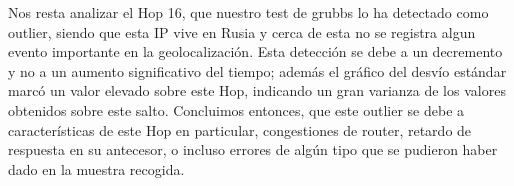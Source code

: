 Nos resta analizar el Hop 16, que nuestro test de grubbs lo ha detectado como outlier, siendo que esta IP vive en Rusia y cerca de esta no se registra algun evento importante en la geolocalización. Esta detección se debe a un decremento y no a un aumento significativo del tiempo; además el gráfico del desvío estándar marcó un valor elevado sobre este Hop, indicando un gran varianza de los valores obtenidos sobre este salto. Concluimos entonces, que este outlier se debe a características de este Hop en particular, congestiones de router, retardo de respuesta en su antecesor, o incluso errores de algún tipo que se pudieron haber dado en la muestra recogida.




    


